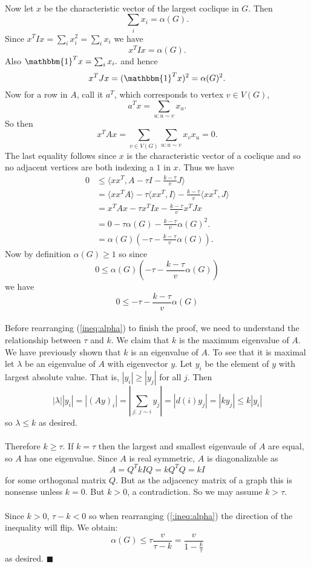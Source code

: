 \documentclass[letterpaper,12pt,oneside,onecolumn]{article}
\newcommand{\1}{\mathbbm{1}}
\begin{document}
\paragraph{}
Now let $x$ be the characteristic vector of the largest coclique in $G$. Then 
$$\sum_{i} x_i = \alpha(G).$$
Since $x^TIx = \sum_{i} x_i^2 = \sum_{i} x_i$ we have
$$x^TIx = \alpha(G).$$
Also $\1^Tx = \sum_{i} x_i.$ and hence
$$x^TJx = (\1^Tx)^2 = \alpha(G)^2.$$
Now for a row in $A$, call it $a^T$, which corresponds to vertex $v \in V(G)$,
$$a^Tx = \sum_{u: u\sim v} x_u.$$
So then
$$x^T A x = \sum_{v \in V(G)} \sum_{u:u\sim v} x_v x_u = 0.$$
The last equality follows since $x$ is the characteristic vector of a coclique and so no adjacent vertices are both indexing a $1$ in $x$.
Thus we have
\begin{align*}
0 &\leq \langle xx^T, A - \tau I - \frac{k - \tau}{v} J \rangle \\
&= \langle xx^TA\rangle - \tau \langle xx^T, I \rangle - \frac{k - \tau}{v} \langle xx^T, J \rangle \\
&= x^TAx - \tau x^TIx -\frac{k - \tau}{v} x^TJ x \\
&= 0 - \tau \alpha(G) - \frac{k -\tau}{v} \alpha (G)^2. \\
&= \alpha(G)(-\tau - \frac{k-\tau}{v} \alpha(G)).
\end{align*}
Now by definition $\alpha(G) \geq 1$ so since 
$$ 0 \leq \alpha(G)(-\tau - \frac{k-\tau}{v} \alpha(G))$$
we have
\begin{equation}
0 \leq -\tau - \frac{k-\tau}{v} \alpha(G) \label{ineq:alpha}\end{equation}
\paragraph{}
Before rearranging (\ref{ineq:alpha}) to finish the proof, we need to understand the relationship between $\tau$ and $k$. We claim that $k$ is the maximum eigenvalue of $A$. We have previously shown that $k$ is an eigenvalue of $A$. To see that it is maximal let $\lambda$ be an eigenvalue of $A$ with eigenvector $y$. Let $y_i$ be the element of $y$ with largest absolute value. That is, $|y_i| \geq |y_j|$ for all $j$. Then
$$ |\lambda| |y_i| = |(Ay)_i| = |\sum_{j:\ j \sim i} y_j| = |d(i) y_j| = |k y_j| \leq k|y_i|$$
so $\lambda \leq k$ as desired.
\paragraph{}
Therefore $k \geq \tau$. If $k = \tau$ then the largest and smallest eigenvaule of $A$ are equal, so $A$ has one eigenvalue. Since $A$ is real symmetric, $A$ is diagonalizable as
$$A = Q^T k I Q = kQ^TQ = kI$$
for some orthogonal matrix $Q$. But as the adjacency matrix of a graph this is nonsense unless $k = 0$. But $k > 0$, a contradiction. So we may assume $k > \tau$.
\paragraph{}
Since $k > 0$, $\tau - k < 0$ so when rearranging (\ref{:ineq:alpha}) the direction of the inequality will flip. We obtain:
$$\alpha(G) \leq \tau\frac{v}{\tau-k} = \frac{v}{1-\frac{k}{\tau}}$$
as desired. $\blacksquare$
\end{document}
